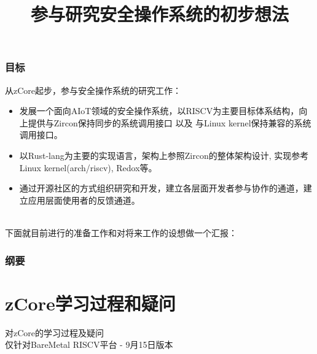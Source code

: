 \documentclass[
8pt, %
]{beamer}
\title{参与研究安全操作系统的初步想法}
\institute[Massclouds]{\large 乾云科技}
\begin{document}
	\renewcommand\arraystretch{2}

	\begin{frame}
		\titlepage
	\end{frame}

	\begin{frame}
		\frametitle{目标}
		{\large 从zCore起步，参与安全操作系统的研究工作：}
		\begin{itemize}
			\item {\large 发展一个面向AIoT领域的安全操作系统，以RISCV为主要目标体系结构，向上提供与Zircon保持同步的系统调用接口 以及 与Linux kernel保持兼容的系统调用接口。}
			\item {\large 以Rust-lang为主要的实现语言，架构上参照Zircon的整体架构设计, 实现参考Linux kernel(arch/riscv), Redox等。}
			\item {\large 通过开源社区的方式组织研究和开发，建立各层面开发者参与协作的通道，建立应用层面使用者的反馈通道。}
		\end{itemize}
        ~\\
		{\large 下面就目前进行的准备工作和对将来工作的设想做一个汇报：}
	\end{frame}

	\begin{frame}
		\frametitle{纲要}
		\tableofcontents
	\end{frame}

	\section{zCore学习过程和疑问}

	\begin{frame}
		\begin{center}
			{\LARGE 对zCore的学习过程及疑问\\}
			\bigskip\bigskip
			{\large 仅针对BareMetal RISCV平台 - 9月15日版本}
		\end{center}
	\end{frame}
\end{document}
